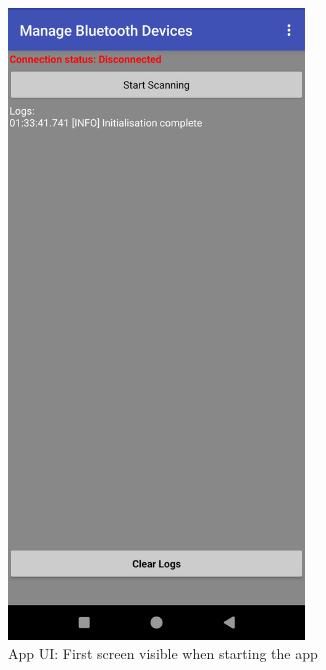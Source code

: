 \begin{figure}[H]
	\centering
	\includegraphics[width=0.7\textwidth]{images/app_ui_main_disconnected}
	\caption{App UI: First screen visible when starting the app}
	\label{appendix:app_ui_disconnected}
\end{figure}

